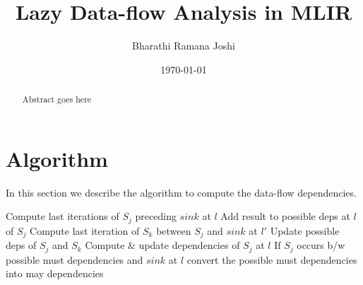 \documentclass[12pt]{article}
\author{Bharathi Ramana Joshi}
\title{Lazy Data-flow Analysis in MLIR}
\date{\today}
\begin{document}
\maketitle
\begin{abstract}
  Abstract goes here
\end{abstract}

\section{Algorithm}
In this section we describe the algorithm to compute the data-flow dependencies.
\begin{algorithmic}[1]
        \State Compute last iterations of $S_j$ preceding $sink$ at $l$
        \State Add result to possible deps at $l$ of $S_j$
            \State Compute last iteration of $S_k$ between $S_j$ and $sink$ at $l'$
            \State Update possible deps of $S_j$ and $S_k$
          \EndFor
        \EndFor
      \EndFor
        \State Compute \& update dependencies of $S_j$ at $l$
        \State If $S_j$ occurs b/w possible must dependencies and $sink$ at $l$
        convert the possible must dependencies into may dependencies
      \EndFor
    \EndFor
  \EndFunction
\end{algorithmic}
\end{document}
